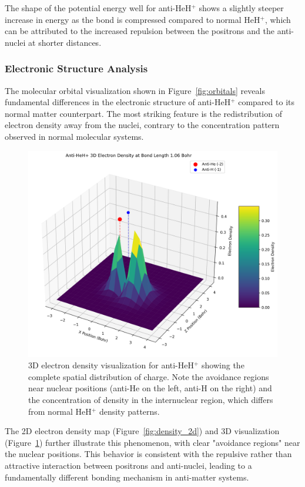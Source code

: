 \documentclass[10pt,twocolumn,a4paper]{article}
\begin{document}
The shape of the potential energy well for anti-HeH$^+$ shows a slightly steeper increase in energy as the bond is compressed compared to normal HeH$^+$, which can be attributed to the increased repulsion between the positrons and the anti-nuclei at shorter distances.

\subsubsection{Electronic Structure Analysis}
The molecular orbital visualization shown in Figure~\ref{fig:orbitals} reveals fundamental differences in the electronic structure of anti-HeH$^+$ compared to its normal matter counterpart. The most striking feature is the redistribution of electron density away from the nuclei, contrary to the concentration pattern observed in normal molecular systems.

\begin{figure}[t!]
    \centering
    \includegraphics[width=\columnwidth]{graphs/anti_heh_density_3d.png}
    \caption{3D electron density visualization for anti-HeH$^+$ showing the complete spatial distribution of charge. Note the avoidance regions near nuclear positions (anti-He on the left, anti-H on the right) and the concentration of density in the internuclear region, which differs from normal HeH$^+$ density patterns.}
    \label{fig:density_3d}
\end{figure}

The 2D electron density map (Figure~\ref{fig:density_2d}) and 3D visualization (Figure~\ref{fig:density_3d}) further illustrate this phenomenon, with clear "avoidance regions" near the nuclear positions. This behavior is consistent with the repulsive rather than attractive interaction between positrons and anti-nuclei, leading to a fundamentally different bonding mechanism in anti-matter systems.
\end{document}
